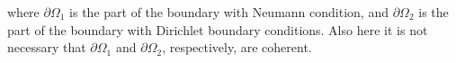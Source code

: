 \documentclass{report}
\begin{document}



where $\partial \Omega_1$ is the part of the boundary with Neumann
condition, and $\partial \Omega_2$ is the part of the boundary with
Dirichlet boundary conditions. Also here it is not necessary that
$\partial \Omega_1$ and $\partial \Omega_2$, respectively, are
coherent.


%
%
\end{document}
